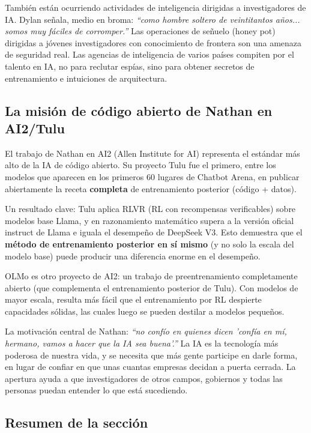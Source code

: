\documentclass[a4paper]{article}
\begin{document}
También están ocurriendo actividades de inteligencia dirigidas a investigadores de IA. Dylan señala, medio en broma: \textit{``como hombre soltero de veintitantos años... somos muy fáciles de corromper.''} Las operaciones de señuelo (honey pot) dirigidas a jóvenes investigadores con conocimiento de frontera son una amenaza de seguridad real. Las agencias de inteligencia de varios países compiten por el talento en IA, no para reclutar espías, sino para obtener secretos de entrenamiento e intuiciones de arquitectura.

\subsection{La misión de código abierto de Nathan en AI2/Tulu}

El trabajo de Nathan en AI2 (Allen Institute for AI) representa el estándar más alto de la IA de código abierto. Su proyecto Tulu fue el primero, entre los modelos que aparecen en los primeros 60 lugares de Chatbot Arena, en publicar abiertamente la receta \textbf{completa} de entrenamiento posterior (código + datos).

Un resultado clave: Tulu aplica RLVR (RL con recompensas verificables) sobre modelos base Llama, y en razonamiento matemático supera a la versión oficial instruct de Llama e iguala el desempeño de DeepSeek V3. Esto demuestra que el \textbf{método de entrenamiento posterior en sí mismo} (y no solo la escala del modelo base) puede producir una diferencia enorme en el desempeño.

OLMo es otro proyecto de AI2: un trabajo de preentrenamiento completamente abierto (que complementa el entrenamiento posterior de Tulu). Con modelos de mayor escala, resulta más fácil que el entrenamiento por RL despierte capacidades sólidas, las cuales luego se pueden destilar a modelos pequeños.

La motivación central de Nathan: \textit{``no confío en quienes dicen 'confía en mí, hermano, vamos a hacer que la IA sea buena'.''} La IA es la tecnología más poderosa de nuestra vida, y se necesita que más gente participe en darle forma, en lugar de confiar en que unas cuantas empresas decidan a puerta cerrada. La apertura ayuda a que investigadores de otros campos, gobiernos y todas las personas puedan entender lo que está sucediendo.

\subsection{Resumen de la sección}
\end{document}
